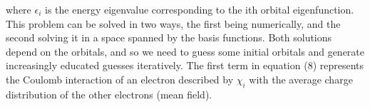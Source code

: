 \documentclass[10pt]{article}
\begin{document}
where $\epsilon_i$ is the energy eigenvalue corresponding to the ith orbital eigenfunction. This problem can be solved in two ways, the first being numerically, and the second solving it in a space spanned by the basis functions. Both solutions depend on the orbitals, and so we need to guess some initial orbitals and generate increasingly educated guesses iteratively. The first term in equation (8) represents the Coulomb interaction of an electron described by $\chi_i$ with the average charge distribution of the other electrons (mean field). 






\end{document}
